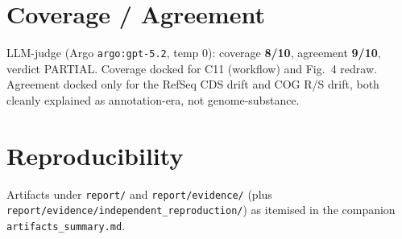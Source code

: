 \documentclass[11pt]{article}
\begin{document}
\section{Coverage / Agreement}
LLM-judge (Argo \texttt{argo:gpt-5.2}, temp 0): coverage \textbf{8/10}, agreement \textbf{9/10}, verdict PARTIAL. Coverage docked for C11 (workflow) and Fig.\ 4 redraw. Agreement docked only for the RefSeq CDS drift and COG R/S drift, both cleanly explained as annotation-era, not genome-substance.

\section{Reproducibility}
Artifacts under \texttt{report/} and \texttt{report/evidence/} (plus \texttt{report/evidence/independent\_reproduction/}) as itemised in the companion \texttt{artifacts\_summary.md}.
\end{document}
